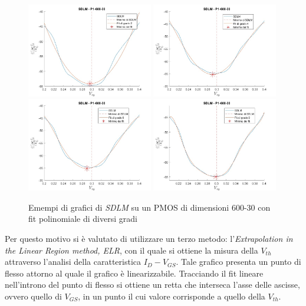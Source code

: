 \documentclass[12pt, letterpaper]{book}
\begin{document}
\begin{figure}[h!]
\centering
 \includegraphics[width=0.49\textwidth]{SDLM-P1-600-30-grado2}
 \includegraphics[width=0.49\textwidth]{SDLM-P1-600-30-grado4}
 \includegraphics[width=0.49\textwidth]{SDLM-P1-600-30-grado6}
 \includegraphics[width=0.49\textwidth]{SDLM-P1-600-30-grado8}
 \caption{Emempi di grafici di \emph{SDLM} su un PMOS di dimensioni 600-30 con fit polinomiale di diversi gradi}
\end{figure}



Per questo motivo si è valutato di utilizzare un terzo metodo: l'\emph{Extrapolation in the Linear Region method, ELR}, con il quale si ottiene la misura della $V_{th}$ attraverso l'analisi della caratteristica $I_D-V_{GS}$.  Tale grafico presenta un punto di flesso attorno al quale il grafico è linearizzabile. Tracciando il fit lineare nell'introno del punto di flesso si ottiene un retta che interseca l'asse delle ascisse, ovvero quello di $V_{GS}$, in un punto il cui valore corrisponde a quello della $V_{th}$.\\
\end{document}

